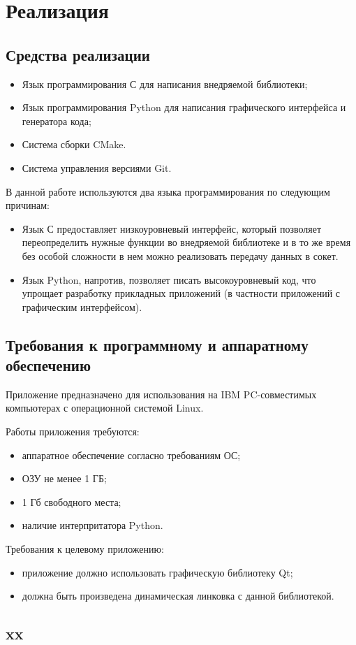 \chapter{Реализация}

\section{Средства реализации}

\begin{itemize}
	\item Язык программирования С для написания внедряемой библиотеки;
	\item Язык программирования Python для написания графического интерфейса и
		генератора кода;
	\item Система сборки CMake.
	\item Система управления версиями Git.
\end{itemize}

В данной работе используются два языка программирования по следующим причинам:

\begin{itemize}
	\item Язык С предоставляет низкоуровневый интерфейс, который позволяет
		переопределить нужные функции во внедряемой библиотеке и в то же время
		без особой сложности в нем можно реализовать передачу данных в сокет.
	\item Язык Python, напротив, позволяет писать высокоуровневый код, что
		упрощает разработку прикладных приложений (в частности приложений с
		графическим интерфейсом).
\end{itemize}

\section{Требования к программному и аппаратному обеспечению}

Приложение предназначено для использования на IBM PC-совместимых компьютерах с
операционной системой Linux.

Работы приложения требуются:

\begin{itemize}
	\item аппаратное обеспечение согласно требованиям ОС;
	\item ОЗУ не менее 1 ГБ;
	\item 1 Гб свободного места;
	\item наличие интерпритатора Python.
\end{itemize}

Требования к целевому приложению:

\begin{itemize}
	\item приложение должно использовать графическую библиотеку Qt;
	\item должна быть произведена динамическая линковка с данной библиотекой.
\end{itemize}



\section{xx}
